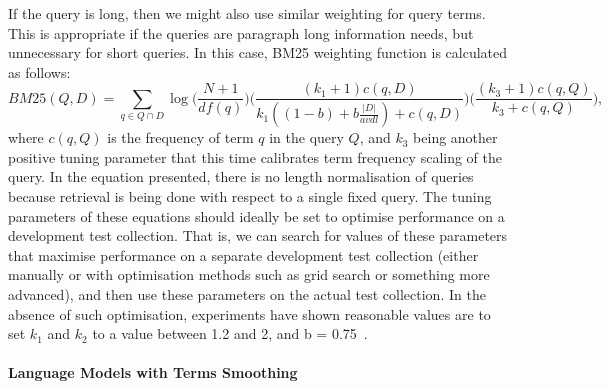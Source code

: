 If the query is long, then we might also use similar weighting for query terms. This is appropriate if the queries are paragraph long information needs, but unnecessary for short queries. 
In this case, BM25 weighting function is calculated as follows:
\begin{equation}
BM25(Q,D)=\sum\limits_{q \in Q\cap D}\log\Bigg(\frac{N+1}{df(q)}\Bigg)\Bigg(\frac{(k_{1}+1)c(q,D)}{k_{1}((1-b)+b\frac{|D|}{avdl})+c(q,D)}\Bigg)\Bigg(\frac{(k_{3}+1)c(q,Q)}{k_{3}+c(q,Q)}\Bigg),
\label{eq:idfbm25}
\end{equation}
where $ c(q,Q) $ is the frequency of term $ q $ in the query $ Q $, and $ k_{3} $ being another positive tuning parameter that this time calibrates term frequency scaling of the query. In the equation presented, there is no length normalisation of
queries because retrieval is being done with respect to a single fixed query. The tuning parameters of these equations should ideally be set to optimise performance on a development test collection. That is, we can search for values of these parameters that maximise performance on a separate development test collection (either manually or with optimisation methods such as grid search or something more advanced), and then use these parameters on the actual test collection. In the absence of such optimisation, experiments have shown reasonable values are to set $ k_{1} $ and $ k_{2} $ to a value between 1.2 and 2, and b = 0.75~\citep{manning2008introduction}.

\paragraph{Language Models with Terms Smoothing}
\ \\
